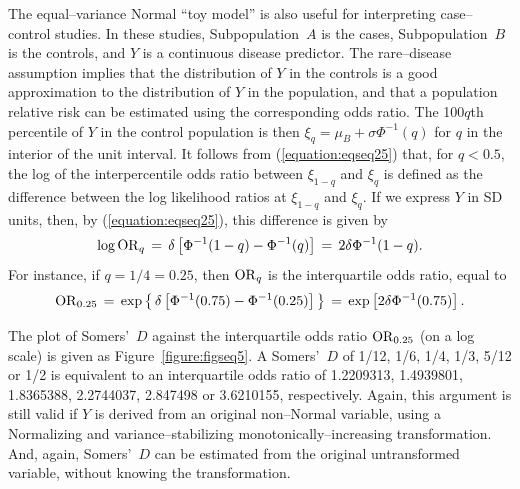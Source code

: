 \documentclass[a4paper,notitlepage]{article}      %
\begin{document}
The equal--variance Normal ``toy model'' is also useful for interpreting case--control studies.
In these studies, Subpopulation~$A$ is the cases, Subpopulation~$B$ is the controls,
and $Y$ is a continuous disease predictor.
The rare--disease assumption implies that the distribution of $Y$ in the controls
is a good approximation to the distribution of $Y$ in the population,
and that a population relative risk can be estimated using the corresponding odds ratio.
The 100$q$th percentile of $Y$ in the control population is then $\xi_q=\mu_B+\sigma\Phi^{-1}(q)$
for $q$ in the interior of the unit interval.
It follows from (\ref{equation:eqseq25}) that, for $q<0.5$,
the log of the interpercentile odds ratio between $\xi_{1-q}$ and $\xi_q$
is defined as the difference between the log likelihood ratios at $\xi_{1-q}$ and $\xi_q$.
If we express $Y$ in SD units, then, by (\ref{equation:eqseq25}), this difference is given by
\def\OR{{\rm OR}}
\begin{equation}
\log \OR_q \, = \, \delta \left[ \Phi^{-1}(1-q) - \Phi^{-1}(q) \right] \, = \, 2 \delta \Phi^{-1}(1-q).
\label{equation:eqseq28}
\end{equation}
For instance, if $q=1/4=0.25$, then $\OR_q$ is the interquartile odds ratio,
equal to
\begin{equation}
\OR_{0.25} \, = \, \exp \left\{ \, \delta \left[ \Phi^{-1}(0.75) - \Phi^{-1}(0.25) \right] \, \right\}
\, = \, \exp \left[ 2 \delta \Phi^{-1}(0.75) \right].
\label{equation:eqseq29}
\end{equation}

The plot of Somers'~$D$ against the interquartile odds ratio $\OR_{0.25}$ (on a log scale)
is given as Figure~\ref{figure:figseq5}.
A Somers'~$D$ of 1/12, 1/6, 1/4, 1/3, 5/12 or 1/2 is equivalent to an interquartile odds ratio
of 1.2209313, 1.4939801, 1.8365388, 2.2744037, 2.847498 or 3.6210155, respectively.
Again, this argument is still valid if $Y$ is derived from an original non--Normal variable,
using  a Normalizing and variance--stabilizing monotonically--increasing transformation.
And, again, Somers'~$D$ can be estimated from the original untransformed variable,
without knowing the transformation.
\end{document}
